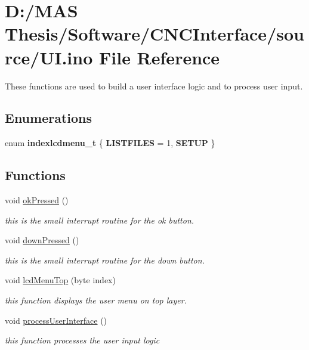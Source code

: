 \hypertarget{_u_i_8ino}{\section{D\-:/\-M\-A\-S Thesis/\-Software/\-C\-N\-C\-Interface/source/\-U\-I.ino File Reference}
\label{_u_i_8ino}
}


These functions are used to build a user interface logic and to process user input.  


\subsection*{Enumerations}
\begin{DoxyCompactItemize}
\item 
enum {\bfseries indexlcdmenu\-\_\-t} \{ {\bfseries L\-I\-S\-T\-F\-I\-L\-E\-S} = 1, 
{\bfseries S\-E\-T\-U\-P}
 \}
\end{DoxyCompactItemize}
\subsection*{Functions}
\begin{DoxyCompactItemize}
\item 
\hypertarget{_u_i_8ino_a703998b64c9a3b68ee3c47f5a9fe3631}{void \hyperlink{_u_i_8ino_a703998b64c9a3b68ee3c47f5a9fe3631}{ok\-Pressed} ()}\label{_u_i_8ino_a703998b64c9a3b68ee3c47f5a9fe3631}

\begin{DoxyCompactList}\small\item\em this is the small interrupt routine for the ok button. \end{DoxyCompactList}\item 
\hypertarget{_u_i_8ino_ac3465cb35ba356dc7b25316ebecf6418}{void \hyperlink{_u_i_8ino_ac3465cb35ba356dc7b25316ebecf6418}{down\-Pressed} ()}\label{_u_i_8ino_ac3465cb35ba356dc7b25316ebecf6418}

\begin{DoxyCompactList}\small\item\em this is the small interrupt routine for the down button. \end{DoxyCompactList}\item 
void \hyperlink{_u_i_8ino_a47414a10985cd7bb4080431fc73920a9}{lcd\-Menu\-Top} (byte index)
\begin{DoxyCompactList}\small\item\em this function displays the user menu on top layer. \end{DoxyCompactList}\item 
\hypertarget{_u_i_8ino_a2a62b0a8356a6b15d85e3dcba1af98bf}{void \hyperlink{_u_i_8ino_a2a62b0a8356a6b15d85e3dcba1af98bf}{process\-User\-Interface} ()}\label{_u_i_8ino_a2a62b0a8356a6b15d85e3dcba1af98bf}

\begin{DoxyCompactList}\small\item\em this function processes the user input logic \end{DoxyCompactList}\end{DoxyCompactItemize}
